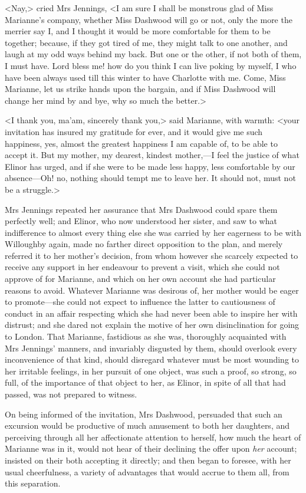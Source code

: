<Nay,> cried Mrs Jennings, <I am sure I shall be monstrous glad of Miss Marianne's company, whether Miss Dashwood will go or not, only the more the merrier say I, and I thought it would be more comfortable for them to be together; because, if they got tired of me, they might talk to one another, and laugh at my odd ways behind my back. But one or the other, if not both of them, I must have. Lord bless me! how do you think I can live poking by myself, I who have been always used till this winter to have Charlotte with me. Come, Miss Marianne, let us strike hands upon the bargain, and if Miss Dashwood will change her mind by and bye, why so much the better.>

<I thank you, ma'am, sincerely thank you,> said Marianne, with warmth: <your invitation has insured my gratitude for ever, and it would give me such happiness, yes, almost the greatest happiness I am capable of, to be able to accept it. But my mother, my dearest, kindest mother,—I feel the justice of what Elinor has urged, and if she were to be made less happy, less comfortable by our absence—Oh! no, nothing should tempt me to leave her. It should not, must not be a struggle.>

Mrs Jennings repeated her assurance that Mrs Dashwood could spare them perfectly well; and Elinor, who now understood her sister, and saw to what indifference to almost every thing else she was carried by her eagerness to be with Willoughby again, made no farther direct opposition to the plan, and merely referred it to her mother's decision, from whom however she scarcely expected to receive any support in her endeavour to prevent a visit, which she could not approve of for Marianne, and which on her own account she had particular reasons to avoid. Whatever Marianne was desirous of, her mother would be eager to promote—she could not expect to influence the latter to cautiousness of conduct in an affair respecting which she had never been able to inspire her with distrust; and she dared not explain the motive of her own disinclination for going to London. That Marianne, fastidious as she was, thoroughly acquainted with Mrs Jennings' manners, and invariably disgusted by them, should overlook every inconvenience of that kind, should disregard whatever must be most wounding to her irritable feelings, in her pursuit of one object, was such a proof, so strong, so full, of the importance of that object to her, as Elinor, in spite of all that had passed, was not prepared to witness.

On being informed of the invitation, Mrs Dashwood, persuaded that such an excursion would be productive of much amusement to both her daughters, and perceiving through all her affectionate attention to herself, how much the heart of Marianne was in it, would not hear of their declining the offer upon \textit{her} account; insisted on their both accepting it directly; and then began to foresee, with her usual cheerfulness, a variety of advantages that would accrue to them all, from this separation.

